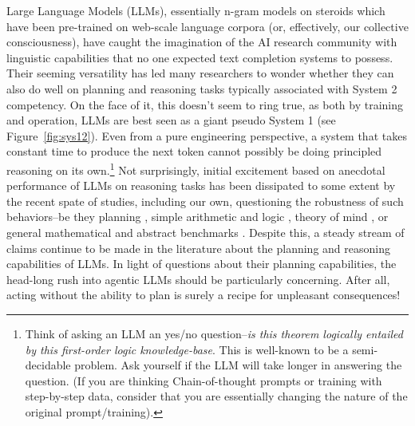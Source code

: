 \documentclass{article}
\newcommand{\rao}[1]{\noindent\textcolor{red}{#1}}
\theoremstyle{plain}
\theoremstyle{definition}
\theoremstyle{remark}
\begin{document}
Large Language Models (LLMs), essentially n-gram models on steroids which have been pre-trained on web-scale language corpora
(or, effectively, our collective consciousness), have caught the imagination of the AI research community with linguistic capabilities that no one expected text completion systems to possess. Their seeming versatility has led many researchers to wonder whether they can also do well on planning and reasoning tasks typically associated with System 2 competency. On the face of it, this doesn't seem to ring true, as both by training and operation, LLMs are best seen as a giant pseudo System 1 \cite{thinking-fast-slow} (see Figure~\ref{fig:sys12}). Even from a pure engineering perspective, a system that takes constant time to produce the next token cannot possibly be doing principled reasoning on its own.\footnote{Think of asking an LLM an yes/no question--{\em is this theorem logically entailed by this first-order logic knowledge-base}. This is well-known to be a semi-decidable problem. Ask yourself if the LLM will take longer in answering the question.  
(If you are thinking Chain-of-thought prompts or training with step-by-step data, consider that you are essentially changing the nature of the original prompt/training).
}
Not surprisingly, initial excitement based on anecdotal performance of
LLMs on reasoning tasks \cite{bubeck2023sparks} has been dissipated to some
extent by the recent spate of studies, including our own, questioning the robustness of such behaviors--be they planning \cite{valmeekam2023on,rao-cacm}, simple arithmetic and logic \cite{dziri2023faith}, theory of mind \cite{ullman2023large,verma2024theory}, or general mathematical and abstract benchmarks \cite{mccoy2023embers,gendron2023large}.
%
Despite this, a steady stream of claims continue to be made in the
literature about the planning and reasoning capabilities of LLMs.
%
In light of questions about their planning capabilities, the head-long rush into agentic LLMs should be particularly concerning. After all, acting without
the ability to plan is surely a recipe for unpleasant consequences!
\end{document}
